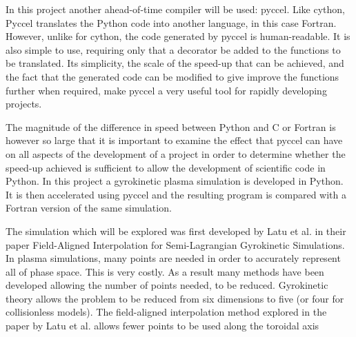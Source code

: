 In this project another ahead-of-time compiler will be used: pyccel. Like cython, Pyccel translates the Python code into another language, in this case Fortran. However, unlike for cython, the code generated by pyccel is human-readable. It is also simple to use, requiring only that a decorator be added to the functions to be translated. Its simplicity, the scale of the speed-up that can be achieved, and the fact that the generated code can be modified to give improve the functions further when required, make pyccel a very useful tool for rapidly developing projects.

The magnitude of the difference in speed between Python and C or Fortran is however so large that it is important to examine the effect that pyccel can have on all aspects of the development of a project in order to determine whether the speed-up achieved is sufficient to allow the development of scientific code in Python. In this project a gyrokinetic plasma simulation is developed in Python. It is then accelerated using pyccel and the resulting program is compared with a Fortran version of the same simulation.

The simulation which will be explored was first developed by Latu et al. \cite{YamanPaper} in their paper Field-Aligned Interpolation for Semi-Lagrangian Gyrokinetic Simulations. In plasma simulations, many points are needed in order to accurately represent all of phase space. This is very costly. As a result many methods have been developed allowing the number of points needed, to be reduced. Gyrokinetic theory allows the problem to be reduced from six dimensions to five (or four for collisionless models). The field-aligned interpolation method explored in the paper by Latu et al. allows fewer points to be used along the toroidal axis

